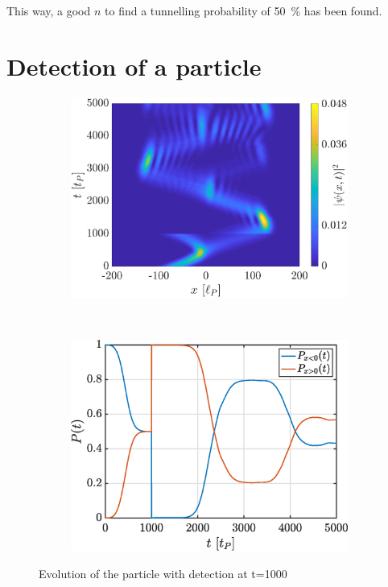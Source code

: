 \documentclass[a4paper,12pt,twoside]{article}
\begin{document}
      This way, a good $n$ to find a tunnelling probability of \SI{50}{\percent} has been found.


\newpage
\section{Detection of a particle}

\begin{figure}[h]
        \centering
        \begin{subfigure}[t]{0.45\textwidth}
          \includegraphics[width=\textwidth]{graphs/iv_det_Evo.eps}
          \caption{}
          \label{fig:iv_det_Evo}
        \end{subfigure}
        ~
        \begin{subfigure}[t]{0.45\textwidth}
          \includegraphics[width=\textwidth]{graphs/iv_det_Prob.eps}
          \caption{}
          \label{fig:iv_det_Prob}
        \end{subfigure}
        \caption{Evolution of the particle with detection at t=1000}
        \label{fig:iv_det}
\end{figure}
\end{document}
